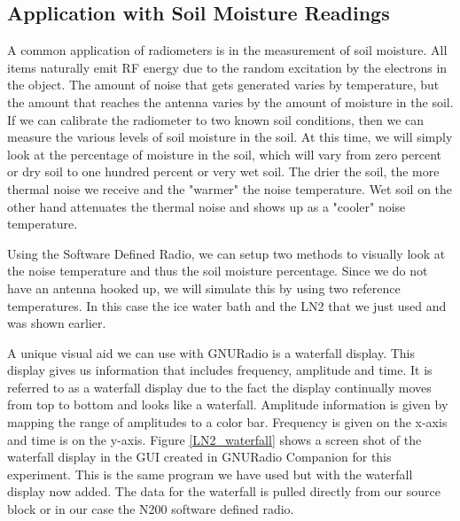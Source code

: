 \subsection{Application with Soil Moisture Readings}
A common application of radiometers is in the measurement of soil moisture.  All items naturally emit RF energy due to the random excitation by the electrons in the object.  The amount of noise that gets generated varies by temperature, but the amount that reaches the antenna varies by the amount of moisture in the soil.  If we can calibrate the radiometer to two known soil conditions, then we can measure the various levels of soil moisture in the soil.  At this time, we will simply look at the percentage of moisture in the soil, which will vary from zero percent or dry soil to one hundred percent or very wet soil.  The drier the soil, the more thermal noise we receive and the "warmer" the noise temperature.  Wet soil on the other hand attenuates the thermal noise and shows up as a "cooler" noise temperature.  

Using the Software Defined Radio, we can setup two methods to visually look at the noise temperature and thus the soil moisture percentage.  Since we do not have an antenna hooked up, we will simulate this by using two reference temperatures.  In this case the ice water bath and the LN2 that we just used and was shown earlier.  

A unique visual aid we can use with GNURadio is a waterfall display.  This display gives us information that includes frequency, amplitude and time.  It is referred to as a waterfall display due to the fact the display continually moves from top to bottom and looks like a waterfall.  Amplitude information is given by mapping the range of amplitudes to a color bar.  Frequency is given on the x-axis and time is on the y-axis.  Figure \ref{LN2_waterfall} shows a screen shot of the waterfall display in the GUI created in GNURadio Companion for this experiment.  This is the same program we have used but with the waterfall display now added.  The data for the waterfall is pulled directly from our source block or in our case the N200 software defined radio.

